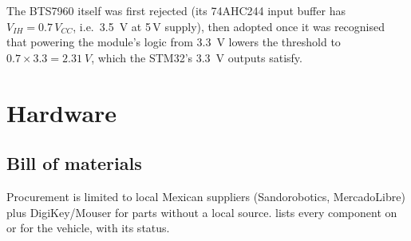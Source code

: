 \documentclass[11pt,a4paper]{article}
\begin{document}
The BTS7960 itself was first rejected (its 74AHC244 input buffer has
$V_{IH}=0.7\,V_{CC}$, i.e.\ \qty{3.5}{V} at 5\,V supply), then adopted once it was
recognised that powering the module's logic from \qty{3.3}{V} lowers the threshold
to $0.7\times3.3=\qty{2.31}{V}$, which the STM32's \qty{3.3}{V} outputs satisfy.
\clearpage
\section{Hardware}\label{sec:hardware}

\subsection{Bill of materials}\label{sec:bom}

Procurement is limited to local Mexican suppliers (Sandorobotics, MercadoLibre)
plus DigiKey/Mouser for parts without a local source.  lists every
component on or for the vehicle, with its status.
\end{document}
